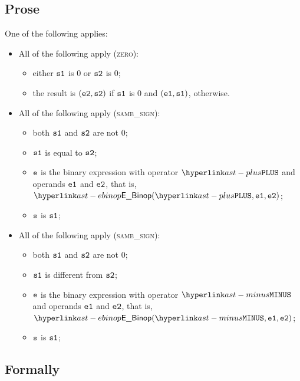 \subsection{Prose}
One of the following applies:
\begin{itemize}
  \item All of the following apply (\textsc{zero}):
  \begin{itemize}
    \item either $\texttt{s1}$ is $0$ or $\texttt{s2}$ is $0$;
    \item the result is $(\texttt{e2}, \texttt{s2})$ if $\texttt{s1}$ is $0$ and $(\texttt{e1}, \texttt{s1})$, otherwise.
  \end{itemize}

  \item All of the following apply (\textsc{same\_sign}):
  \begin{itemize}
    \item both $\texttt{s1}$ and $\texttt{s2}$ are not $0$;
    \item $\texttt{s1}$ is equal to $\texttt{s2}$;
    \item $\texttt{e}$ is the binary expression with operator $\PLUS$ and operands $\texttt{e1}$ and $\texttt{e2}$,
          that is, $\EBinop(\PLUS, \veone, \vetwo)$;
    \item $\texttt{s}$ is $\texttt{s1}$;
  \end{itemize}

  \item All of the following apply (\textsc{same\_sign}):
  \begin{itemize}
    \item both $\texttt{s1}$ and $\texttt{s2}$ are not $0$;
    \item $\texttt{s1}$ is different from $\texttt{s2}$;
    \item $\texttt{e}$ is the binary expression with operator $\MINUS$ and operands $\texttt{e1}$ and $\texttt{e2}$,
          that is, $\EBinop(\MINUS, \veone, \vetwo)$;
    \item $\texttt{s}$ is $\texttt{s1}$;
  \end{itemize}
\end{itemize}

\subsection{Formally}

